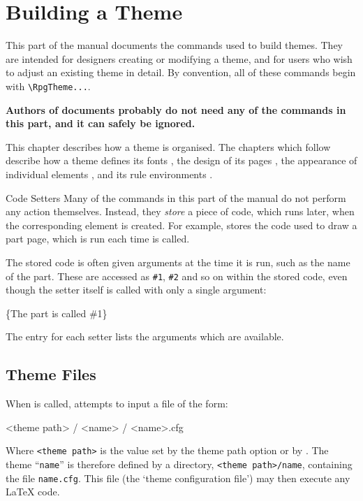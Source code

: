 \chapter{Building a Theme}\label{S:ThemeCommands}


	This part of the manual documents the commands used to build themes. They are intended for designers creating or modifying a theme, and for users who wish to adjust an existing theme in detail. By convention, all of these commands begin with \texttt{\textbackslash{}RpgTheme...}.

	\begin{center}
		\large \bfseries Authors of \rpgtex{} documents probably do not need any of the commands in this part, and it can safely be ignored.
	\end{center}
	This chapter describes how a theme is organised. The chapters which follow describe how a theme defines its fonts , the design of its pages , the appearance of individual elements , and its rule environments .

	\begin{RpgSidebar}{Code Setters}
		Many of the commands in this part of the manual do not perform any action themselves. Instead, they \emph{store} a piece of code, which \rpgtex{} runs later, when the corresponding element is created. For example,  stores the code used to draw a part page, which is run each time  is called.

		The stored code is often given arguments at the time it is run, such as the name of the part. These are accessed as \texttt{\#1}, \texttt{\#2} and so on within the stored code, even though the setter itself is called with only a single argument:
		\begin{Code}
			\{The part is called \#1\}
		\end{Code}
		The entry for each setter lists the arguments which are available.
	\end{RpgSidebar}

	\section{Theme Files}\label{S:ThemeStructure}

		When  is called,  \rpgtex{} attempts to input a file of the form:
		\begin{Code}
			<theme path> / <name> / <name>.cfg
		\end{Code}
		Where \texttt{<theme path>} is the value set by the theme path option  or by . The theme ``\texttt{name}'' is therefore defined by a directory, \texttt{<theme path>/name}, containing the file \texttt{name.cfg}. This file (the `theme configuration file') may then execute any \LaTeX{} code.

